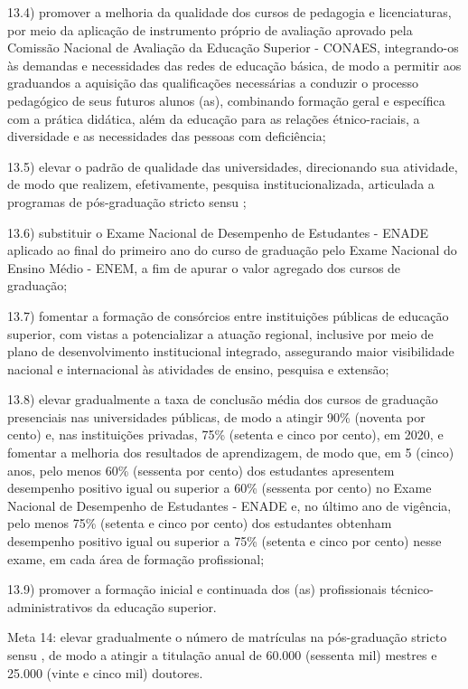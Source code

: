 \documentclass[
]{book}
\begin{document}
13.4) promover a melhoria da qualidade dos cursos de pedagogia e licenciaturas, por meio da aplicação de instrumento próprio de avaliação aprovado pela Comissão Nacional de Avaliação da Educação Superior - CONAES, integrando-os às demandas e necessidades das redes de educação básica, de modo a permitir aos graduandos a aquisição das qualificações necessárias a conduzir o processo pedagógico de seus futuros alunos (as), combinando formação geral e específica com a prática didática, além da educação para as relações étnico-raciais, a diversidade e as necessidades das pessoas com deficiência;

13.5) elevar o padrão de qualidade das universidades, direcionando sua atividade, de modo que realizem, efetivamente, pesquisa institucionalizada, articulada a programas de pós-graduação stricto sensu ;

13.6) substituir o Exame Nacional de Desempenho de Estudantes - ENADE aplicado ao final do primeiro ano do curso de graduação pelo Exame Nacional do Ensino Médio - ENEM, a fim de apurar o valor agregado dos cursos de graduação;

13.7) fomentar a formação de consórcios entre instituições públicas de educação superior, com vistas a potencializar a atuação regional, inclusive por meio de plano de desenvolvimento institucional integrado, assegurando maior visibilidade nacional e internacional às atividades de ensino, pesquisa e extensão;

13.8) elevar gradualmente a taxa de conclusão média dos cursos de graduação presenciais nas universidades públicas, de modo a atingir 90\% (noventa por cento) e, nas instituições privadas, 75\% (setenta e cinco por cento), em 2020, e fomentar a melhoria dos resultados de aprendizagem, de modo que, em 5 (cinco) anos, pelo menos 60\% (sessenta por cento) dos estudantes apresentem desempenho positivo igual ou superior a 60\% (sessenta por cento) no Exame Nacional de Desempenho de Estudantes - ENADE e, no último ano de vigência, pelo menos 75\% (setenta e cinco por cento) dos estudantes obtenham desempenho positivo igual ou superior a 75\% (setenta e cinco por cento) nesse exame, em cada área de formação profissional;

13.9) promover a formação inicial e continuada dos (as) profissionais técnico-administrativos da educação superior.

Meta 14: elevar gradualmente o número de matrículas na pós-graduação stricto sensu , de modo a atingir a titulação anual de 60.000 (sessenta mil) mestres e 25.000 (vinte e cinco mil) doutores.
\end{document}
